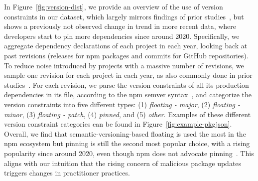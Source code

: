 In Figure~\ref{fig:version-dist}, we provide an overview of the use of version constraints in our dataset,
which largely mirrors findings of prior studies~\cite{DBLP:conf/msr/0001PSTB19, DBLP:journals/tse/DecanM21, DBLP:conf/msr/PinckneyCGB23}, but shows a previously not observed change in trend in more recent data, where developers start to pin more dependencies since around 2020.
Specifically, we aggregate dependency declarations of each project in each year, looking back at past revisions (releases for npm packages and commits for GitHub repositories).  
To reduce noise introduced by projects with a massive number of revisions, we sample one revision for each project in each year, as also commonly done in prior studies~\cite[e.g.,][]{DBLP:conf/msr/PinckneyCGB23, DBLP:conf/kbse/XuHGZ23}.
For each revision, we parse the version constraints of all its production dependencies in its  file, according to the npm semver syntax~\cite{npm-semver}, and categorize the version constraints into five different types: (1) \emph{floating - major}, (2) \emph{floating - minor}, (3) \emph{floating - patch}, (4) \emph{pinned}, and (5) \emph{other}. 
Examples of these different version constraint categories can be found in Figure~\ref{fig:example-pkgjson}.
Overall, we find that semantic-versioning-based floating is used the most in the npm ecosystem but  pinning is still the second most popular choice, with a rising popularity since around 2020, even though npm does not advocate pinning~\cite{npm-semver}.
This aligns with our intuition that the rising concern of malicious package updates triggers changes in practitioner practices.
